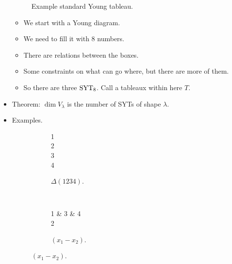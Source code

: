 \documentclass[../notes.tex]{subfiles}
\begin{document}
\begin{itemize}
\begin{figure}[h!]
        \caption{Example standard Young tableau.}
        \label{fig:SYTex}
    \end{figure}
    \begin{itemize}
        \item We start with a Young diagram.
        \item We need to fill it with 8 numbers.
        \item There are relations between the boxes.
        \item Some constraints on what can go where, but there are more of them.
        \item So there are three $\operatorname{SYT}_8$. Call a tableaux within here $T$.
    \end{itemize}
    \item Theorem: $\dim V_\lambda$ is the number of SYTs of shape $\lambda$.
    \item Examples.
    \begin{figure}[h!]
        \centering
        \begin{subfigure}[b]{0.15\linewidth}
            \centering
            \begin{ytableau}
                1\\
                2\\
                3\\
                4\\
            \end{ytableau}
            \caption{$\Delta(1234)$.}
            \label{fig:SYT4a}
        \end{subfigure}\\[1em]
        \begin{subfigure}[b]{0.15\linewidth}
            \centering
            \begin{ytableau}
                1 & 3 & 4\\
                2\\
            \end{ytableau}
            \caption{$(x_1-x_2)$.}
            \label{fig:SYT4b}
        \end{subfigure}

\end{figure}
\end{itemize}
\end{document}
